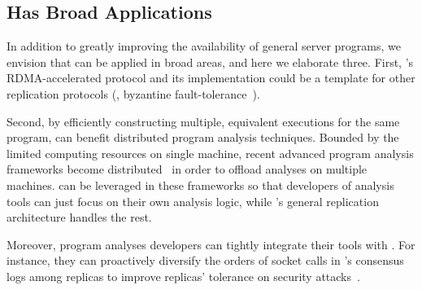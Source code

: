 


\subsection{\xxx Has Broad Applications}\label{sec:apps}

In addition to greatly improving the availability of general server programs, 
we envision that \xxx can be applied in broad areas, and here we elaborate 
three. First, \xxx's RDMA-accelerated \paxos protocol and its implementation 
could be a template for other replication protocols (\eg, byzantine 
fault-tolerance~\cite{zyzzyva:sosp07,pbft:osdi99}). 



Second, by efficiently constructing multiple, equivalent executions for the 
same program, \xxx can benefit distributed program analysis techniques. Bounded 
by the limited computing resources on single machine, recent advanced 
program analysis frameworks become 
distributed~\cite{decouple:usenix08, speck:asplos08, 
shadowreplica:ccs13, wester:parallelizing:asplos13,repframe:apsys15} in order to 
offload analyses on multiple machines. \xxx can be leveraged in these 
frameworks so that developers of analysis tools can just focus on their own 
analysis logic, while \xxx's general replication architecture handles the rest.

Moreover, program analyses developers can tightly integrate their tools with 
\xxx. For instance, they can proactively diversify the orders of socket calls 
in \xxx's consensus logs among replicas to improve replicas' tolerance on 
security attacks~\cite{con:hotpar12}.

